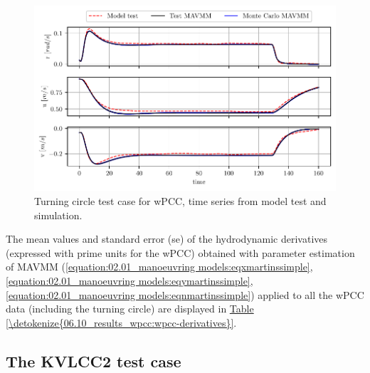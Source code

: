 \begin{figure}[h!]
\centering
\includegraphics[width=1.0\textwidth]{kappa/images/12.pdf}
\caption{Turning circle test case for wPCC, time series from model test and simulation.}\label{\detokenize{06.10_results_wpcc:fig-testing-sim}}\end{figure}
\noindent The mean values and standard error (se) of the hydrodynamic derivatives (expressed with prime units for the wPCC) obtained with parameter estimation of MAVMM (\autoref{equation:02.01_manoeuvring models:eqxmartinssimple}, \autoref{equation:02.01_manoeuvring models:eqymartinssimple},  \autoref{equation:02.01_manoeuvring models:eqnmartinssimple}) applied to all the wPCC data (including the turning circle)  are displayed in \hyperref[\detokenize{06.10_results_wpcc:wpcc-derivatives}]{Table \ref{\detokenize{06.10_results_wpcc:wpcc-derivatives}}}.


\clearpage
\subsection{The KVLCC2 test case}
\label{\detokenize{05.01_case_studies:the-kvlcc2-test-scenarios}}

